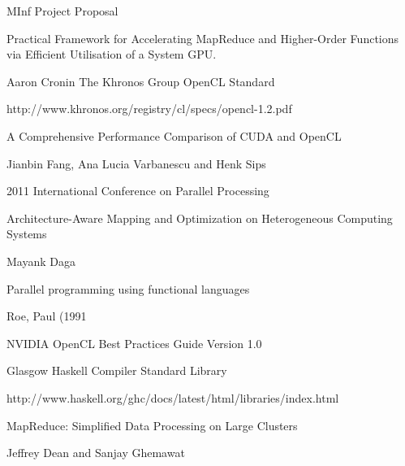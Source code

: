 \documentclass[11pt,a4paper,twocolumn] {scrartcl}   %
\begin{document}
\maketitle
{}

\pagebreak{}

%
%






\begin{thebibliography}{9}

\thispagestyle{empty}
\pagestyle{empty}
    MInf Project Proposal

    Practical Framework for Accelerating MapReduce and Higher-Order Functions via Efficient Utilisation of a System GPU.

    Aaron Cronin
    The Khronos Group OpenCL Standard

    http://www.khronos.org/registry/cl/specs/opencl-1.2.pdf

    A Comprehensive Performance Comparison of
    CUDA and OpenCL

    Jianbin Fang, Ana Lucia Varbanescu and Henk Sips

    2011 International Conference on Parallel Processing

    Architecture-Aware Mapping and Optimization on Heterogeneous Computing Systems

    Mayank Daga

    Parallel programming using functional languages

    Roe, Paul (1991

    NVIDIA OpenCL Best Practices Guide Version 1.0

    Glasgow Haskell Compiler Standard Library

    http://www.haskell.org/ghc/docs/latest/html/libraries/index.html

    MapReduce: Simplified Data Processing on Large Clusters

    Jeffrey Dean and Sanjay Ghemawat


\end{thebibliography}
\end{document}
